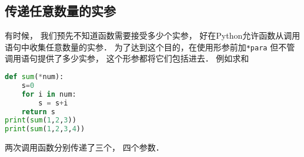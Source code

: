 \subsection{传递任意数量的实参}
有时候， 我们预先不知道函数需要接受多少个实参， 好在Python允许函数从调用语句中收集任意数量的实参． 为了达到这个目的，在使用形参前加\verb|*para| 但不管调用语句提供了多少实参， 这个形参都将它们包括进去． 例如求和
\begin{lstlisting}[language=python]
def sum(*num):
    s=0
    for i in num:
        s = s+i
    return s
print(sum(1,2,3))
print(sum(1,2,3,4))
\end{lstlisting}
两次调用函数分别传递了三个， 四个参数．